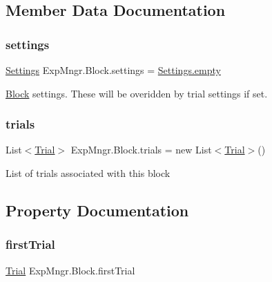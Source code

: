 \subsection{Member Data Documentation}
\mbox{\label{class_exp_mngr_1_1_block_a5392f1a9ba6398d764ba7f9663fcceed}} 
\subsubsection{\texorpdfstring{settings}{settings}}
{\footnotesize\ttfamily \hyperlink{class_exp_mngr_1_1_settings}{Settings} Exp\+Mngr.\+Block.\+settings = \hyperlink{class_exp_mngr_1_1_settings_a9a79c93bbbd6158a6ae543a615da6e6a}{Settings.\+empty}}



\hyperlink{class_exp_mngr_1_1_block}{Block} settings. These will be overidden by trial settings if set. 

\mbox{\label{class_exp_mngr_1_1_block_a4dc883b34888c374d391a1ed2a16b135}} 
\subsubsection{\texorpdfstring{trials}{trials}}
{\footnotesize\ttfamily List$<$\hyperlink{class_exp_mngr_1_1_trial}{Trial}$>$ Exp\+Mngr.\+Block.\+trials = new List$<$\hyperlink{class_exp_mngr_1_1_trial}{Trial}$>$()}



List of trials associated with this block 



\subsection{Property Documentation}
\mbox{\label{class_exp_mngr_1_1_block_abd34f0a4dea70e728d8b441ba688e450}} 
\subsubsection{\texorpdfstring{first\+Trial}{firstTrial}}
{\footnotesize\ttfamily \hyperlink{class_exp_mngr_1_1_trial}{Trial} Exp\+Mngr.\+Block.\+first\+Trial\hspace{0.3cm}{\ttfamily [get]}}



